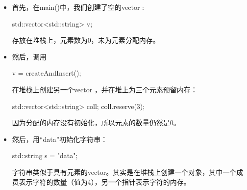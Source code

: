 \begin{itemize}
	\item 首先，在main()中，我们创建了空的vector :
\begin{cppcode}
std::vector<std::string> v;
\end{cppcode}
	存放在堆栈上，元素数为0，未为元素分配内存。
	\item 然后，调用
\begin{cppcode}
v = createAndInsert();
\end{cppcode}
	在堆栈上创建另一个vector ，并在堆上为三个元素预留内存：
\begin{cppcode}
std::vector<std::string> coll;
coll.reserve(3);
\end{cppcode}
	因为分配的内存没有初始化，所以元素的数量仍然是0。
	\item 然后，用“data”初始化字符串：
\begin{cppcode}
std::string s = "data";
\end{cppcode}
	字符串类似于具有元素的vector。其实是在堆栈上创建一个对象，其中一个成员表示字符的数量（值为4），另一个指针表示字符的内存。


\end{itemize}

